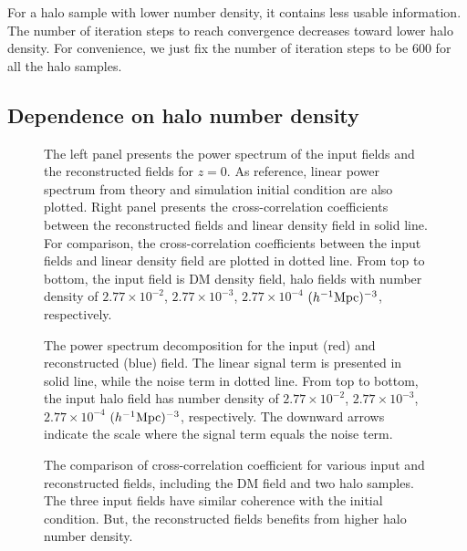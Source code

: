 \documentclass[iop]{emulateapj}
\newcommand{\mpch}{h^{-1} {\rm Mpc}}
\begin{document}
{For a halo sample with lower number density, it contains less usable information.
The number of iteration steps to reach convergence decreases toward lower halo density.
For convenience, we just fix the number of iteration steps to be 600 for all the halo samples.

\subsection{Dependence on halo number density}
\label{sec:numberdensity}

\begin{figure*}
\epsfxsize=8.5cm
\epsfxsize=8.5cm
\caption{The left panel presents the power spectrum of the input fields and the reconstructed fields for $z=0$.
As reference, linear power spectrum from theory and simulation initial condition are also plotted.
Right panel presents the cross-correlation coefficients between the reconstructed fields and linear density field in solid line.
For comparison, the cross-correlation coefficients between the input fields and linear density field are plotted in dotted line.
From top to bottom, the input field is DM density field, halo fields with number density of $2.77\times 10^{-2}$, $2.77\times 10^{-3}$, $2.77\times 10^{-4}$ $(\mpch)^{-3}$, respectively.}
\label{fig:powercc}
\end{figure*}

\begin{figure}
\epsfxsize=8.5cm
\caption{The power spectrum decomposition for the input (red) and reconstructed (blue) field.
The linear signal term is presented in solid line, while the noise term in dotted line.
From top to bottom, the input halo field has number density of $2.77\times 10^{-2}$, $2.77\times 10^{-3}$, $2.77\times 10^{-4}$ $(\mpch)^{-3}$, respectively.
The downward arrows indicate the scale where the signal term equals the noise term.}
\label{fig:decom}
\end{figure}

\begin{figure}
\epsfxsize=8.5cm
\caption{The comparison of cross-correlation coefficient for various input and reconstructed fields, including
the DM field and two halo samples.
The three input fields have similar coherence with the initial condition.
But, the reconstructed fields benefits from higher halo number density.}
\label{fig:ccnh}
\end{figure}

}
\end{document}

